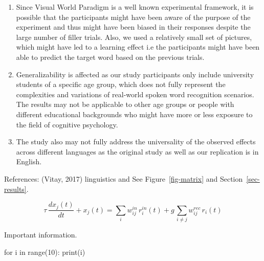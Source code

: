 \documentclass[
  a4paper,
]{article}
\newenvironment{Shaded}{}{}
\newcommand{\BuiltInTok}[1]{\textcolor[rgb]{0.84,0.23,0.29}{#1}}
\newcommand{\ControlFlowTok}[1]{\textcolor[rgb]{0.84,0.23,0.29}{#1}}
\newcommand{\DecValTok}[1]{\textcolor[rgb]{0.00,0.36,0.77}{#1}}
\newcommand{\KeywordTok}[1]{\textcolor[rgb]{0.84,0.23,0.29}{#1}}
\newcommand{\NormalTok}[1]{\textcolor[rgb]{0.14,0.16,0.18}{#1}}
\begin{document}
\begin{enumerate}
\def\labelenumi{\arabic{enumi}.}
\item
  Since Visual World Paradigm is a well known experimental framework, it
  is possible that the participants might have been aware of the purpose
  of the experiment and thus might have been biased in their responses
  despite the large number of filler trials. Also, we used a relatively
  small set of pictures, which might have led to a learning effect i.e
  the participants might have been able to predict the target word based
  on the previous trials.
\item
  Generalizability is affected as our study participants only include
  university students of a specific age group, which does not fully
  represent the complexities and variations of real-world spoken word
  recognition scenarios. The results may not be applicable to other age
  groups or people with different educational backgrounds who might have
  more or less exposure to the field of cognitive psychology.
\item
  The study also may not fully address the universality of the observed
  effects across different languages as the original study as well as
  our replication is in English.
\end{enumerate}

References: (Vitay, 2017) linguistics and See Figure~\ref{fig-matrix}
and Section~\ref{sec-results}.

\[
    \tau \, \frac{dx_j(t)}{dt} + x_j(t)= \sum_i w^{in}_{ij} \, r^{in}_i(t) + g \, \sum_{i \neq j} w^{rec}_{ij} \, r_i(t)
\]

\begin{tcolorbox}[enhanced jigsaw, toprule=.15mm, colbacktitle=quarto-callout-note-color!10!white, opacityback=0, rightrule=.15mm, colframe=quarto-callout-note-color-frame, coltitle=black, titlerule=0mm, breakable, colback=white, arc=.35mm, opacitybacktitle=0.6, bottomrule=.15mm, bottomtitle=1mm, leftrule=.75mm, toptitle=1mm, title=\textcolor{quarto-callout-note-color}{\faInfo}\hspace{0.5em}{Nota Bene}, left=2mm]

Important information.

\end{tcolorbox}

\begin{Shaded}
\begin{Highlighting}[]
\ControlFlowTok{for}\NormalTok{ i }\KeywordTok{in} \BuiltInTok{range}\NormalTok{(}\DecValTok{10}\NormalTok{):}
    \BuiltInTok{print}\NormalTok{(i)}
\end{Highlighting}
\end{Shaded}
\end{document}
